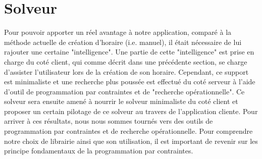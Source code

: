 \chapter{Solveur}





Pour pouvoir apporter un réel avantage à notre application, comparé à la méthode actuelle de création d'horaire (i.e. manuel), il était nécessaire de lui rajouter une certaine "intelligence". 
Une partie de cette "intelligence" est prise en charge du coté client, qui comme décrit dans une précédente section, se charge d'assister l'utilisateur lors de la création de son horaire.
\newline
\indent
Cependant, ce support est minimaliste et une recherche plus poussée est effectué du coté serveur à l'aide d'outil de programmation par contraintes et de "recherche opérationnelle".  Ce solveur sera ensuite amené à nourrir le solveur minimaliste du coté client et proposer un certain pilotage de ce solveur au travers de l'application cliente. 
\newline
\indent
Pour arriver à ces résultats, nous nous sommes tournés vers des outils de programmation par contraintes et de recherche opérationnelle. 
Pour comprendre notre choix de librairie ainsi que son utilisation, il est important de revenir sur les principe fondamentaux de la programmation par contraintes.


